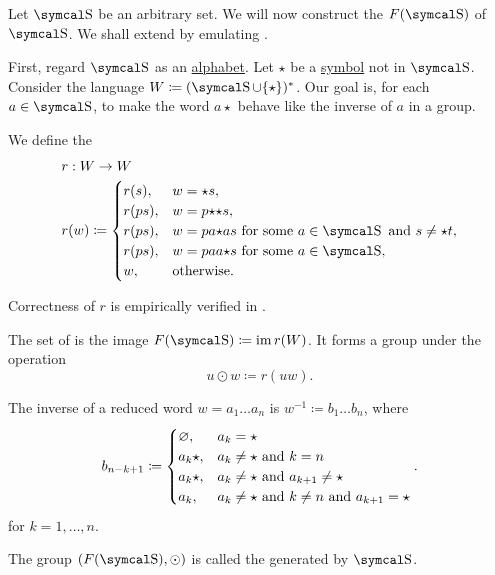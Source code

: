 \begin{definition}\label{def:free_group}
  Let \( \CS \) be an arbitrary set. We will now construct the  \( F(\CS) \) of \( \CS \). We shall extend  by emulating .

  First, regard \( \CS \) as an \hyperref[def:language/alphabet]{alphabet}. Let \( {\star} \) be a \hyperref[def:language/symbol]{symbol} not in \( \CS \). Consider the language \( W \coloneqq (\CS \cup \{ {\star} \})^{\ast} \). Our goal is, for each \( a \in \CS \), to make the word \( a{\star} \) behave like the inverse of \( a \) in a group.

  We define the 
  \begin{align*}
    &r: W \to W \\
    &r(w) \coloneqq \begin{cases}
      r(s),           &w = {\star}s, \\
      r(ps),          &w = p{\star}{\star}s, \\
      r(ps),          &w = p a{\star}a s \text{ for some } a \in \CS \Tand s \neq {\star}t, \\
      r(ps),          &w = p aa{\star} s \text{ for some } a \in \CS, \\
      w,              &\text{otherwise}.
    \end{cases}
  \end{align*}

  Correctness of \( r \) is empirically verified in \cite{code:free_group_reduction}.

  The set of  is the image \( F(\CS) \coloneqq \Img r(W) \). It forms a group under the operation
  \begin{equation*}
    u \odot w \coloneqq r(uw).
  \end{equation*}

  The inverse of a reduced word \( w = a_1 \ldots a_n \) is \( w^{-1} \coloneqq b_1 \ldots b_n \), where
   \begin{equation*}
     b_{n-k+1} \coloneqq \begin{cases}
       \varnothing, &a_k = {\star} \\
       a_k{\star},   &a_k \neq {\star} \text{ and } k = n \\
       a_k{\star},   &a_k \neq {\star} \text{ and } a_{k+1} \neq {\star} \\
       a_k,         &a_k \neq {\star} \text{ and } k \neq n \text{ and } a_{k+1} = {\star} \\
     \end{cases}.
   \end{equation*}
   for \( k = 1, \ldots, n \).

  The group \( (F(\CS), \odot) \) is called the  generated by \( \CS \).
\end{definition}


